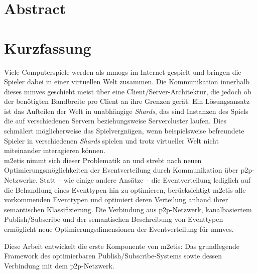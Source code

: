 \chapter*{Abstract}


\clearpage{\pagestyle{empty}\cleardoublepage}
\chapter*{Kurzfassung}
Viele Computerspiele werden als \acfp{mmog} im Internet gespielt und bringen die Spieler dabei in einer virtuellen Welt zusammen. Die Kommunikation innerhalb dieses \acfp{mmve} geschieht meist über eine Client/Server-Architektur, die jedoch ob der benötigten Bandbreite pro Client an ihre Grenzen gerät. Ein Lösungsansatz ist das Aufteilen der Welt in unabhängige \emph{Shards}, das sind Instanzen des Spiels die auf verschiedenen Servern beziehungsweise Servercluster laufen. Dies schmälert möglicherweise das Spielvergnügen, wenn beispielsweise befreundete Spieler in verschiedenen \emph{Shards} spielen und trotz virtueller Welt nicht miteinander interagieren können.\\
\ac{m2etis} nimmt sich dieser Problematik an und strebt nach neuen Optimierungsmöglichkeiten der Eventverteilung durch Kommunikation über \ac{p2p}-Netzwerke. Statt -- wie einige andere Ansätze -- die Eventverteilung lediglich auf die Behandlung eines Eventtypen hin zu optimieren, berücksichtigt \ac{m2etis} alle vorkommenden Eventtypen und optimiert deren Verteilung anhand ihrer semantischen Klassifizierung. Die Verbindung aus \ac{p2p}-Netzwerk, kanalbasiertem Publish/Subscribe und der semantischen Beschreibung von Eventtypen ermöglicht neue Optimierungsdimensionen der Eventverteilung für \acp{mmve}.

Diese Arbeit entwickelt die erste Komponente von \ac{m2etis}: Das grundlegende Framework des optimierbaren Publish/Subscribe-Systems sowie dessen Verbindung mit dem \ac{p2p}-Netzwerk.
